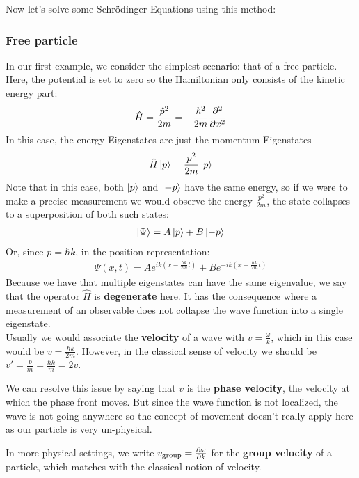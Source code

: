 Now let's solve some Schrödinger Equations using this method:

\subsubsection{Free particle}
In our first example, we consider the simplest scenario: that of a free particle. 
Here, the potential is set to zero so the Hamiltonian only consists of the kinetic energy part:
\begin{align*}
	\hat{H} = \frac{\hat{p}^2}{2m} = - \frac{\hbar^2}{2m} \frac{\partial^2}{\partial x^2}
\end{align*}
In this case, the energy Eigenstates are just the momentum Eigenstates
\begin{align*}
	\hat{H} \ket{p} = \frac{p^2}{2m}\ket{p}	
\end{align*}
Note that in this case, both $\ket{p}$ and $\ket{-p}$ have the same energy, so if we were to make a precise measurement we would observe the energy $\frac{p^2}{2m}$, the state collapses to a superposition of both such states:
\begin{align*}
	\ket{\Psi} = A\ket{p} + B \ket{-p}
\end{align*}
Or, since $p = \hbar k$, in the position representation:
\begin{align*}
	\Psi(x,t) = A e^{ik\left(x - \frac{\hbar k}{2m}t\right)} + B e^{-ik\left(x + \frac{\hbar k}{2m}t\right)}
\end{align*}
Because we have that multiple eigenstates can have the same eigenvalue, we say that the operator $\hat{H}$ is \textbf{degenerate} here.
It has the consequence where a measurement of an observable does not collapse the wave function into a single eigenstate.\\


Usually we would associate the \textbf{velocity} of a wave with $v = \frac{\omega}{k}$, which in this case would be $v = \frac{\hbar k}{2m}$.
However, in the classical sense of velocity we should be $v' = \frac{p}{m} = \frac{\hbar k}{m} = 2v$.

We can resolve this issue by saying that $v$ is the \textbf{phase velocity}, the velocity at which the phase front moves. But since the wave function is not localized, the wave is not going anywhere so the concept of movement doesn't really apply here as our particle is very un-physical.

In more physical settings, we write $v_{\text{group}} = \frac{\partial \omega}{\partial k}$ for the \textbf{group velocity} of a particle, which matches with the classical notion of velocity.


